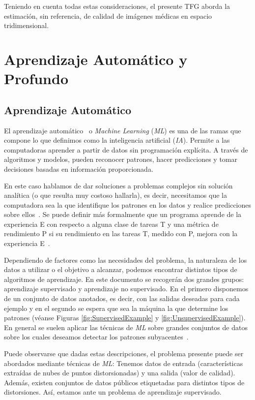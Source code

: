 Teniendo en cuenta todas estas consideraciones, el presente TFG aborda la
estimación, sin referencia, de calidad de imágenes médicas en espacio tridimensional.



\section{Aprendizaje Automático y Profundo}
\subsection{Aprendizaje Automático}
El aprendizaje automático~\cite{IAModernApproach} o \emph{Machine Learning} (\emph{ML}) 
es una de las ramas que compone lo que definimos como 
la inteligencia artificial (\emph{IA}). Permite a las computadoras aprender a partir de datos sin programación explícita. 
A través de algoritmos y modelos, pueden reconocer patrones, hacer predicciones y tomar decisiones basadas en información proporcionada.

En este caso hablamos de dar soluciones a problemas complejos sin 
solución analítica (o que resulta muy costoso hallarla), es decir, necesitamos que la computadora sea la que identifique
los patrones en los datos y realice predicciones sobre ellos~\cite{LearningFromData}.
Se puede definir más formalmente que un programa aprende de la experiencia E con
respecto a alguna clase de tareas T y una métrica de rendimiento P si su
rendimiento en las tareas T, medido con P, mejora con la experiencia E~\cite{TomMitchell}.

Dependiendo de factores como las necesidades del problema, la naturaleza
de los datos a utilizar o el objetivo a alcanzar, podemos encontrar distintos tipos de
algoritmos de aprendizaje. En este documento se recogerán dos grandes grupos: aprendizaje supervisado 
y aprendizaje no supervisado. En el primero disponemos de un conjunto de datos 
anotados, es decir, con las salidas deseadas para cada ejemplo y en el segundo 
se espera que sea la máquina la que determine los patrones (véanse Figuras \ref{fig:SupervisedExample} y \ref{fig:UnsupervisedExample}). 
En general se suelen aplicar las técnicas de \emph{ML} sobre grandes conjuntos 
de datos sobre los cuales deseamos detectar los patrones subyacentes~\cite{
DataMiningHandbook}.

Puede observarse que dadas estas descripciones, el problema presente puede ser 
abordados mediante técnicas de \emph{ML}: Tenemos datos de entrada (características 
extraídas de nubes de puntos distorsionadas) y una salida (valor de calidad). Además, existen conjuntos de 
datos públicos etiquetadas para distintos tipos de distorsiones. Así,
estamos ante un problema de aprendizaje supervisado.


